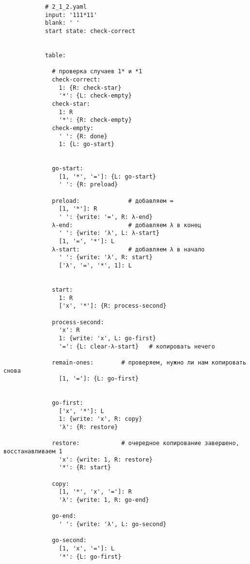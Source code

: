 \documentclass{article}
\begin{document}
\begin{enumerate}
        \begin{verbatim}
            # 2_1_2.yaml
            input: '111*11'
            blank: ' '
            start state: check-correct
            
            
            table:
            
              # проверка случаев 1* и *1
              check-correct:
                1: {R: check-star}
                '*': {L: check-empty}
              check-star:
                1: R
                '*': {R: check-empty}
              check-empty:
                ' ': {R: done}
                1: {L: go-start}
              
              
              go-start:
                [1, '*', '=']: {L: go-start}
                ' ': {R: preload}
              
              preload:              # добавляем = 
                [1, '*']: R
                ' ': {write: '=', R: λ-end}
              λ-end:                # добавляем λ в конец
                ' ': {write: 'λ', L: λ-start}
                [1, '=', '*']: L
              λ-start:              # добавляем λ в начало
                ' ': {write: 'λ', R: start}
                ['λ', '=', '*', 1]: L
                
                
              start:              
                1: R
                ['x', '*']: {R: process-second}
                
              process-second:
                'x': R
                1: {write: 'x', L: go-first}
                '=': {L: clear-λ-start}   # копировать нечего
              
              remain-ones:        # проверяем, нужно ли нам копировать снова
                [1, '=']: {L: go-first}
                
              
              go-first:
                ['x', '*']: L
                1: {write: 'x', R: copy}
                'λ': {R: restore} 
              
              restore:            # очередное копирование завершено, восстанавливаем 1
                'x': {write: 1, R: restore}
                '*': {R: start}
                
              copy:
                [1, '*', 'x', '=']: R
                'λ': {write: 1, R: go-end}
              
              go-end:
                ' ': {write: 'λ', L: go-second}
              
              go-second:
                [1, 'x', '=']: L
                '*': {L: go-first}
            

\end{verbatim}
\end{enumerate}
\end{document}
